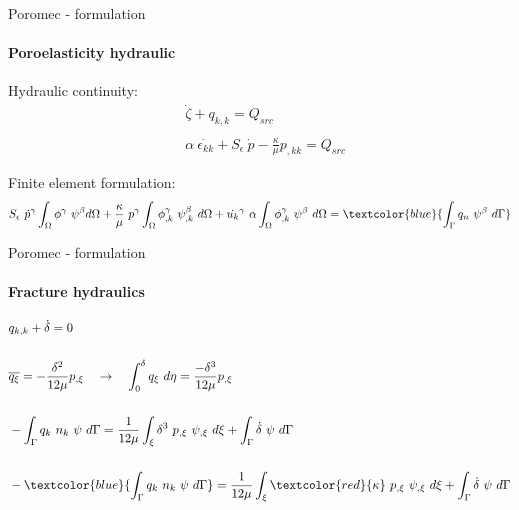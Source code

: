 \begin{frame}{Poromec - formulation}
\framesubtitle{Poroelasticity hydraulic}
Hydraulic continuity:
\begin{align*}
    &\dot{\zeta} + q_{k,k} = Q_{src}\\\\
    &\alpha\ \dot{\epsilon_{kk}} + S_\epsilon\ \dot{p} - \frac{\kappa}{\mu} p_{,kk} = Q_{src}    
\end{align*}

Finite element formulation:
\begin{align*}
    S_\epsilon\ \dot{p}^\gamma\int_\Omega\phi^\gamma\ \psi^\beta d\Omega +
    \frac{\kappa}{\mu}\ p^\gamma\int_\Omega\phi_{,k}^\gamma\ \psi_{,k}^\beta\ d\Omega +
    \dot{u_{k}}^\gamma\ \alpha\int_\Omega\phi_{,k} ^\gamma\ \psi^\beta\ d\Omega =
    \textcolor{blue}{\int_\Gamma q_n\ \psi^\beta\ d\Gamma}
\end{align*}
\end{frame}

\begin{frame}{Poromec - formulation}
\framesubtitle{Fracture hydraulics}
\begin{align*}
   & q_{k,k} + \dot{\delta} = 0 \\\\
   & \overline{q_\xi} = - \frac{\delta^2}{12\mu} p_{,\xi} \quad \rightarrow \quad \int_0^\delta q_\xi\ d\eta = \frac{-\delta^3}{12\mu} p_{,\xi}\\\\
   & - \int_\Gamma q_k\ n_k\ \psi\ d\Gamma = \frac{1}{12\mu}\int_\xi \delta^3\ p_{,\xi}\ \psi_{,\xi}\ d\xi + \int_\Gamma \dot{\delta}\ \psi\ d\Gamma \\\\
   & - \textcolor{blue}{\int_\Gamma q_k\ n_k\ \psi\ d\Gamma} = \frac{1}{12\mu}\int_\xi \textcolor{red}{\kappa} \ p_{,\xi}\ \psi_{,\xi}\ d\xi + \int_\Gamma \dot{\delta}\ \psi\ d\Gamma
\end{align*}
\end{frame}

